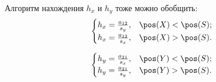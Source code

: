 Алгоритм нахождения $h_x$ и $h_y$ тоже можно обобщить:
$$\begin{cases}
	h_x = \frac{a_{12}}{s_y}, & \pos(X)<\pos(S);\\
	h_x = \frac{a_{12}}{s_x}, & \pos(X)>\pos(S).
\end{cases}$$

$$\begin{cases}
	h_y = \frac{a_{21}}{s_x}, & \pos(Y)<\pos(S);\\
	h_y = \frac{a_{21}}{s_y}, & \pos(Y)>\pos(S).
\end{cases}$$
